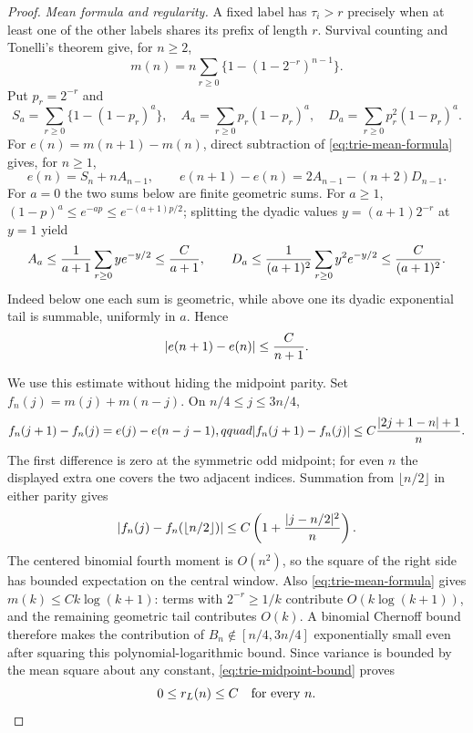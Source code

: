 \documentclass[11pt]{article}
\numberwithin{equation}{section}
\newcommand{\1}{\mathbf 1}\newcommand{\F}{\mathcal F}\newcommand{\D}{\mathcal D}
\begin{document}
\begin{proof}
\emph{Mean formula and regularity.}
A fixed label has $\tau_i>r$ precisely when at least one of the other labels
shares its prefix of length $r$.  Survival counting and Tonelli's theorem
give, for $n\ge2$,
\begin{equation}
 m(n)=n\sum_{r\ge0}\{1-(1-2^{-r})^{n-1}\}.              \label{eq:trie-mean-formula}
\end{equation}
Put $p_r=2^{-r}$ and
\[
 S_a=\sum_{r\ge0}\{1-(1-p_r)^a\},\quad
 A_a=\sum_{r\ge0}p_r(1-p_r)^a,\quad
 D_a=\sum_{r\ge0}p_r^2(1-p_r)^a.
\]
For $e(n)=m(n+1)-m(n)$, direct subtraction of
\eqref{eq:trie-mean-formula} gives, for $n\ge1$,
\begin{equation}
 e(n)=S_n+nA_{n-1},\qquad
 e(n+1)-e(n)=2A_{n-1}-(n+2)D_{n-1}.          \label{eq:trie-mean-differences}
\end{equation}
For $a=0$ the two sums below are finite geometric sums.  For $a\ge1$,
$(1-p)^a\le e^{-ap}\le e^{-(a+1)p/2}$; splitting the dyadic values
$y=(a+1)2^{-r}$ at $y=1$ yield
\[
 A_a\le {1\over a+1}\sum_{r\ge0}y e^{-y/2}\le {C\over a+1},
 \qquad
 D_a\le {1\over(a+1)^2}\sum_{r\ge0}y^2e^{-y/2}\le {C\over(a+1)^2}.
\]
Indeed below one each sum is geometric, while above one its dyadic
exponential tail is summable, uniformly in $a$.  Hence
\begin{equation}
 |e(n+1)-e(n)|\le {C\over n+1}.                         \label{eq:trie-second-difference}
\end{equation}

We use this estimate without hiding the midpoint parity.  Set
$f_n(j)=m(j)+m(n-j)$.  On $n/4\le j\le3n/4$,
\[
 f_n(j+1)-f_n(j)=e(j)-e(n-j-1),qquad
 |f_n(j+1)-f_n(j)|\le C{|2j+1-n|+1\over n}.
\]
The first difference is zero at the symmetric odd midpoint; for even $n$
the displayed extra one covers the two adjacent indices.  Summation from
$\lfloor n/2\rfloor$ in either parity gives
\begin{equation}
 |f_n(j)-f_n(\lfloor n/2\rfloor)|
 \le C\left(1+{|j-n/2|^2\over n}\right).                \label{eq:trie-midpoint-bound}
\end{equation}
The centered binomial fourth moment is $O(n^2)$, so the square of the
right side has bounded expectation on the central window.  Also
\eqref{eq:trie-mean-formula} gives $m(k)\le Ck\log(k+1)$: terms with
$2^{-r}\ge1/k$ contribute $O(k\log(k+1))$, and the remaining geometric
tail contributes $O(k)$.  A binomial Chernoff bound therefore makes the
contribution of $B_n\notin[n/4,3n/4]$ exponentially small even after
squaring this polynomial-logarithmic bound.  Since variance is bounded by
the mean square about any constant, \eqref{eq:trie-midpoint-bound} proves
\begin{equation}0\le r_L(n)\le C\quad\hbox{for every }n.  \label{eq:trie-force-bounded}
\end{equation}


\end{proof}
\end{document}
